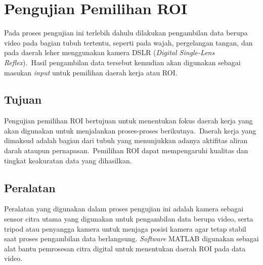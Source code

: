 \section{Pengujian Pemilihan ROI}
Pada proses pengujian ini terlebih dahulu dilakukan pengambilan data berupa video pada bagian tubuh tertentu, seperti pada wajah, pergelangan tangan, dan pada daerah leher menggunakan kamera DSLR (\textit{Digital Single-Lens Reflex}).~Hasil pengambilan data tersebut kemudian akan digunakan sebagai masukan \textit{input} untuk pemilihan daerah kerja atau ROI.
\subsection{Tujuan}
Pengujian pemilihan ROI bertujuan untuk menentukan fokus daerah kerja yang akan digunakan untuk menjalankan proses-proses berikutnya.~Daerah kerja yang dimaksud adalah bagian dari tubuh yang menunjukkan adanya aktifitas aliran darah ataupun pernapasan.~Pemilihan ROI dapat mempengaruhi kualitas dan tingkat keakuratan data yang dihasilkan.


\subsection{Peralatan}
Peralatan yang digunakan dalam proses pengujian ini adalah kamera sebagai sensor citra utama yang digunakan untuk pengambilan data berupa video, serta tripod atau penyangga kamera untuk menjaga posisi kamera agar tetap stabil saat proses pengambilan data berlangsung. \textit{Software} MATLAB digunakan sebagai alat bantu pemrosesan citra digital untuk menentukan daerah ROI pada data video.


